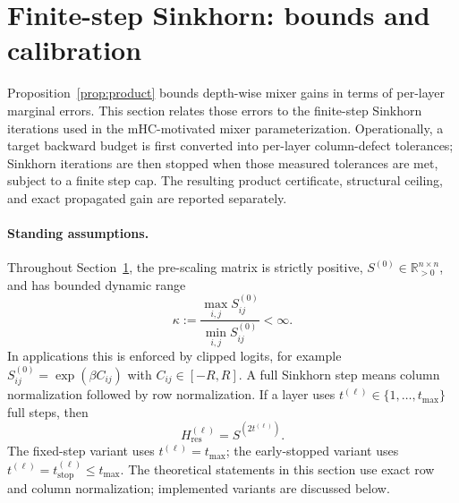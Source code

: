 \documentclass[10pt]{article}
\numberwithin{equation}{section}
\theoremstyle{plain}
\theoremstyle{definition}
\theoremstyle{remark}
\newcommand{\R}{\mathbb{R}}
\newcommand{\Hres}{H_{\mathrm{res}}}
\newcommand{\tstop}{t_{\mathrm{stop}}}
\begin{document}
\section{Finite-step Sinkhorn: bounds and calibration}\label{sec:sinkhorn}

Proposition~\ref{prop:product} bounds depth-wise mixer gains in terms of per-layer marginal errors. This section relates those errors to the finite-step Sinkhorn iterations used in the mHC-motivated mixer parameterization. Operationally, a target backward budget is first converted into per-layer column-defect tolerances; Sinkhorn iterations are then stopped when those measured tolerances are met, subject to a finite step cap. The resulting product certificate, structural ceiling, and exact propagated gain are reported separately.


\paragraph{Standing assumptions.}
Throughout Section~\ref{sec:sinkhorn}, the pre-scaling matrix is strictly
positive, \(S^{(0)}\in\R^{n\times n}_{>0}\), and has bounded dynamic range
\begin{equation}\label{eq:kappa_def}
\kappa:=\frac{\max_{i,j}S^{(0)}_{ij}}{\min_{i,j}S^{(0)}_{ij}}<\infty .
\end{equation}
In applications this is enforced by clipped logits, for example
\(S^{(0)}_{ij}=\exp(\beta C_{ij})\) with \(C_{ij}\in[-R,R]\). A full Sinkhorn
step means column normalization followed by row normalization. If a layer uses
\(t^{(\ell)}\in\{1,\dots,t_{\max}\}\) full steps, then
\begin{equation}\label{eq:H_from_steps}
        \Hres^{(\ell)}=S^{(2t^{(\ell)})}.
\end{equation}
The fixed-step variant uses \(t^{(\ell)}=t_{\max}\); the early-stopped variant
uses \(t^{(\ell)}=\tstop^{(\ell)}\le t_{\max}\). The theoretical statements in
this section use exact row and column normalization; implemented variants are
discussed below.
\end{document}
